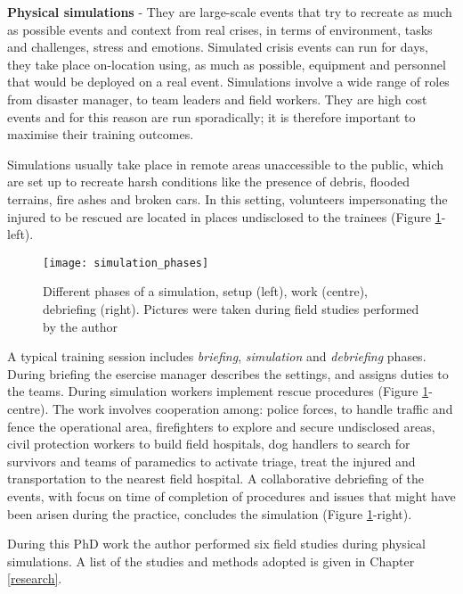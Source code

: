 \textbf{Physical simulations} - They are large-scale events that try to recreate as much as possible events and context from real crises, in terms of environment, tasks and challenges, stress and emotions. Simulated crisis events can run for days, they take place on-location using, as much as possible, equipment and personnel that would be deployed on a real event. Simulations involve a wide range of roles from disaster manager, to team leaders and field workers. They are high cost events and for this reason are run sporadically; it is therefore important to maximise their training outcomes.

Simulations usually take place in remote areas unaccessible to the public, which are set up to recreate harsh conditions like the presence of debris, flooded terrains, fire ashes and broken cars. In this setting, volunteers impersonating the injured to be rescued are located in places undisclosed to the trainees (Figure \ref{fig:simulation-phases}-left).
\begin{figure}
	[tbh] \centering 
	\texttt{[image: simulation\_phases]} \caption{Different phases of a simulation, setup (left), work (centre), debriefing (right). Pictures were taken during field studies performed by the author} \label{fig:simulation-phases} 
\end{figure}

A typical training session includes \emph{briefing}, \emph{simulation} and \emph{debriefing} phases. During briefing the esercise manager describes the settings, and assigns duties to the teams. During simulation workers implement rescue procedures (Figure \ref{fig:simulation-phases}-centre). The work involves cooperation among: police forces, to handle traffic and fence the operational area, firefighters to explore and secure undisclosed areas, civil protection workers to build field hospitals, dog handlers to search for survivors and teams of paramedics to activate triage, treat the injured and transportation to the nearest field hospital. A collaborative debriefing of the events, with focus on time of completion of procedures and issues that might have been arisen during the practice, concludes the simulation (Figure \ref{fig:simulation-phases}-right).

During this PhD work the author performed six field studies during physical simulations. A list of the studies and methods adopted is given in Chapter \ref{research}.


